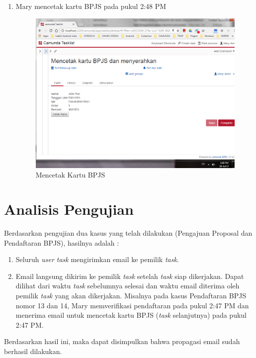 \begin{enumerate}
	\item Mary mencetak kartu BPJS pada pukul 2:48 PM
			\begin{figure}[H]
			\centering
			\includegraphics[scale=0.5]{Gambar/Bab-5/kasus2/15}
			\caption{Mencetak Kartu BPJS} 
			\label{fig:pengujian_kasus2_15}
	\end{figure}
\end{enumerate}





		

\section{Analisis Pengujian}
\label{analisispengujian}
Berdasarkan pengujian dua kasus yang telah dilakukan (Pengajuan Proposal dan Pendaftaran BPJS), hasilnya adalah :
\begin{enumerate}
	\item Seluruh \textit{user task} mengirimkan email ke pemilik \textit{task}.
	\item Email langsung dikirim ke pemilik \textit{task} setelah \textit{task} siap dikerjakan. Dapat dilihat dari waktu \textit{task} sebelumnya selesai dan waktu email diterima oleh pemilik \textit{task} yang akan dikerjakan. Misalnya pada kasus Pendaftaran BPJS nomor 13 dan 14, Mary memverifikasi pendaftaran pada pukul 2:47 PM dan menerima email untuk mencetak kartu BPJS (\textit{task} selanjutnya) pada pukul 2:47 PM.
\end{enumerate}
Berdasarkan hasil ini, maka dapat disimpulkan bahwa propagasi email sudah berhasil dilakukan.